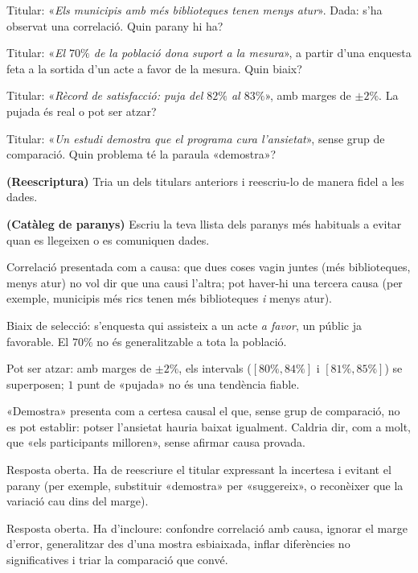 \begin{exercicis}
\begin{exlist}
  \item Titular: «\emph{Els municipis amb més biblioteques tenen menys atur}». Dada: s'ha
        observat una correlació. Quin parany hi ha?
  \item Titular: «\emph{El $70\%$ de la població dona suport a la mesura}», a partir d'una
        enquesta feta a la sortida d'un acte a favor de la mesura. Quin biaix?
  \item Titular: «\emph{Rècord de satisfacció: puja del $82\%$ al $83\%$}», amb marges de
        $\pm 2\%$. La pujada és real o pot ser atzar?
  \item Titular: «\emph{Un estudi demostra que el programa cura l'ansietat}», sense grup de
        comparació. Quin problema té la paraula «demostra»?
  \item \textbf{(Reescriptura)} Tria un dels titulars anteriors i reescriu-lo de manera
        fidel a les dades.
  \item \textbf{(Catàleg de paranys)} Escriu la teva llista dels paranys més habituals a
        evitar quan es llegeixen o es comuniquen dades.
\end{exlist}
\end{exercicis}

\begin{solucions}
\begin{sollist}
  \item Correlació presentada com a causa: que dues coses vagin juntes (més biblioteques,
        menys atur) no vol dir que una causi l'altra; pot haver-hi una tercera causa (per
        exemple, municipis més rics tenen més biblioteques \emph{i} menys atur).
  \item Biaix de selecció: s'enquesta qui assisteix a un acte \emph{a favor}, un públic ja
        favorable. El $70\%$ no és generalitzable a tota la població.
  \item Pot ser atzar: amb marges de $\pm 2\%$, els intervals ($[80\%,84\%]$ i
        $[81\%,85\%]$) se superposen; $1$ punt de «pujada» no és una tendència fiable.
  \item «Demostra» presenta com a certesa causal el que, sense grup de comparació, no es pot
        establir: potser l'ansietat hauria baixat igualment. Caldria dir, com a molt, que
        «els participants milloren», sense afirmar causa provada.
  \item Resposta oberta. Ha de reescriure el titular expressant la incertesa i evitant el
        parany (per exemple, substituir «demostra» per «suggereix», o reconèixer que la
        variació cau dins del marge).
  \item Resposta oberta. Ha d'incloure: confondre correlació amb causa, ignorar el marge
        d'error, generalitzar des d'una mostra esbiaixada, inflar diferències no
        significatives i triar la comparació que convé.
\end{sollist}
\end{solucions}
